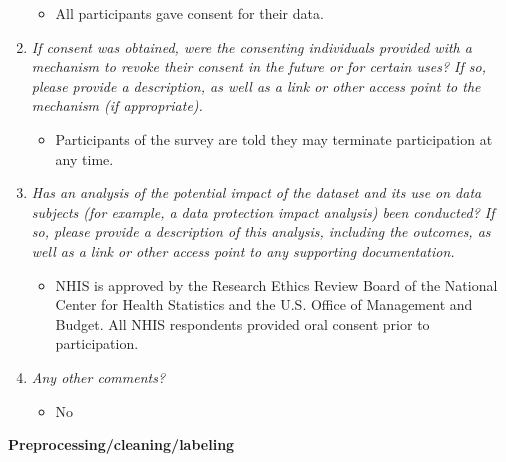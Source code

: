 \documentclass[
]{article}
\providecommand{\tightlist}{%
  \setlength{\itemsep}{0pt}\setlength{\parskip}{0pt}}
\begin{document}
\begin{enumerate}
  \begin{itemize}
  \tightlist
  \item
    All participants gave consent for their data.
  \end{itemize}
\item
  \emph{If consent was obtained, were the consenting individuals provided with a mechanism to revoke their consent in the future or for certain uses? If so, please provide a description, as well as a link or other access point to the mechanism (if appropriate).}

  \begin{itemize}
  \tightlist
  \item
    Participants of the survey are told they may terminate participation at any time.
  \end{itemize}
\item
  \emph{Has an analysis of the potential impact of the dataset and its use on data subjects (for example, a data protection impact analysis) been conducted? If so, please provide a description of this analysis, including the outcomes, as well as a link or other access point to any supporting documentation.}

  \begin{itemize}
  \tightlist
  \item
    NHIS is approved by the Research Ethics Review Board of the National Center for Health Statistics and the U.S. Office of Management and Budget. All NHIS respondents provided oral consent prior to participation.
  \end{itemize}
\item
  \emph{Any other comments?}

  \begin{itemize}
  \tightlist
  \item
    No
  \end{itemize}
\end{enumerate}

\textbf{Preprocessing/cleaning/labeling}
\end{document}
